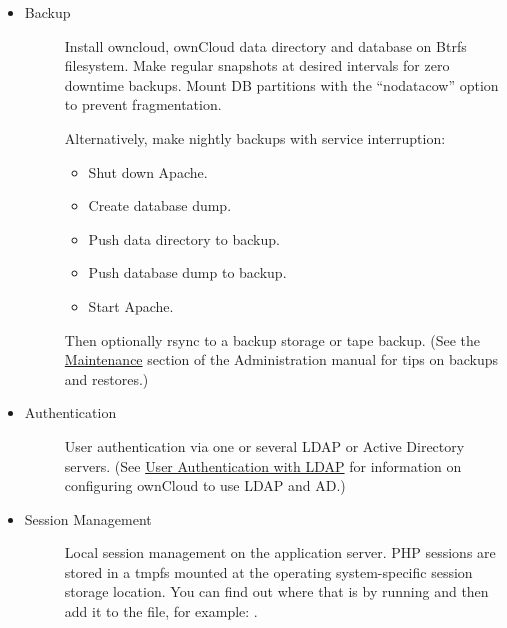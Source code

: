 \documentclass[letterpaper,10pt,english]{sphinxmanual}
\begin{document}
\begin{itemize}
\begin{description}
\end{description}

\item {} \begin{description}
\item[{Backup}] \leavevmode
Install owncloud, ownCloud data directory and database on Btrfs filesystem.
Make regular snapshots at desired intervals for zero downtime backups.
Mount DB partitions with the ``nodatacow'' option to prevent fragmentation.

Alternatively, make nightly backups with service interruption:
\begin{itemize}
\item {} 
Shut down Apache.

\item {} 
Create database dump.

\item {} 
Push data directory to backup.

\item {} 
Push database dump to backup.

\item {} 
Start Apache.

\end{itemize}

Then optionally rsync to a backup storage or tape backup. (See the
\href{https://doc.owncloud.org/server/9.0/admin\_manual/maintenance/index.html}{Maintenance} section of the Administration manual for tips on backups
and restores.)

\end{description}

\item {} \begin{description}
\item[{Authentication}] \leavevmode
User authentication via one or several LDAP or Active Directory servers. (See
\href{https://doc.owncloud.org/server/9.0/admin\_manual/configuration\_user/user\_auth\_ldap.html}{User Authentication with LDAP} for information on configuring ownCloud to
use LDAP and AD.)

\end{description}

\item {} \begin{description}
\item[{Session Management}] \leavevmode
Local session management on the application server. PHP sessions are stored
in a tmpfs mounted at the operating system-specific session storage
location. You can find out where that is by running  and then add it to the  file,
for example:
.


\end{description}
\end{itemize}
\end{document}
